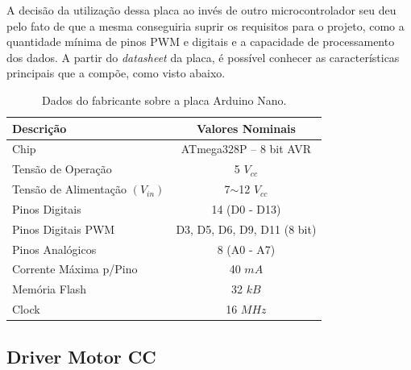 A decisão da utilização dessa placa ao invés de outro microcontrolador seu deu pelo fato de que a mesma conseguiria suprir os requisitos para o projeto, como a quantidade mínima de pinos PWM e digitais e a capacidade de processamento dos dados. A partir do \textit{datasheet} da placa, é possível conhecer as características principais que a compõe, como visto abaixo.
\begin{table}[!htb]\label{tab:CaracteristicaArduinoNano}
\centering
\caption{Dados do fabricante sobre a placa Arduino Nano.}
\begin{tabular}{lc}
\hline
\textbf{Descrição}               & \textbf{Valores Nominais}    \\ \hline
Chip                             & ATmega328P – 8 bit AVR       \\
Tensão de Operação               & 5 $V_{cc}$                   \\
Tensão de Alimentação $(V_{in})$ & 7$\sim$12 $V_{cc}$             \\
Pinos Digitais                   & 14 (D0 - D13)                \\
Pinos Digitais PWM               & D3, D5, D6, D9, D11 (8 bit)  \\ 
Pinos Analógicos                 & 8 (A0 - A7)                  \\
Corrente Máxima p/Pino           & 40 $mA$                      \\
Memória Flash                    & 32 $kB$                      \\
Clock                            & 16 $MHz$                     \\ \hline
\end{tabular}
\end{table}

\subsection{Driver Motor CC}

